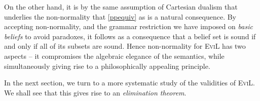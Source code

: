 On the other hand, it is by the same assumption of Cartesian dualism
that underlies the non-normality that \eqref{ppequiv}
as is a natural consequence.  By accepting non-normality, and the
grammar restriction we have imposed on \emph{basic beliefs} to avoid
paradoxes, it follows as a consequence that a belief set is sound if
and only if all of its subsets are sound.  Hence non-normality for
\textsc{EviL} has two aspects -- it compromises the algebraic elegance
of the semantics, while simultaneously giving rise to a philosophically
appealing principle.

In the next section, we turn to a more systematic study of the
validities of \textsc{EviL}.  We shall see that this gives rise to an
\emph{elimination theorem}.

